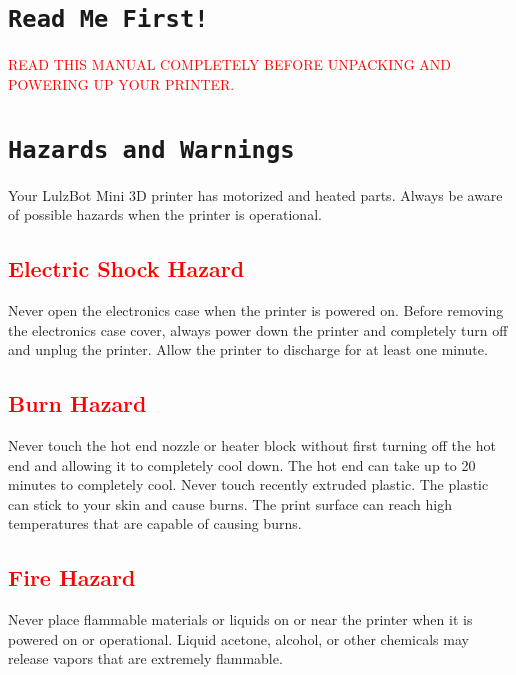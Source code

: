%
%
%
%
%

\section{\texttt{Read Me First!}}
\textcolor{red}{READ THIS MANUAL COMPLETELY BEFORE UNPACKING AND POWERING UP YOUR PRINTER.}

\section{\texttt{Hazards and Warnings}}

Your LulzBot\textsuperscript{\miniscule{\textregistered}} Mini 3D printer has motorized and heated parts.  Always be aware of possible hazards when the printer is operational.


\subsection{\textcolor{red}{Electric Shock Hazard}}
Never open the electronics case when the printer is powered on. Before removing the electronics case cover, always power down the printer and completely turn off and unplug the printer. Allow the printer to discharge for at least one minute.

\subsection{\textcolor{red}{Burn Hazard}}
Never touch the hot end nozzle or heater block without first turning off the hot end and allowing it to completely cool down. The hot end can take up to 20 minutes to completely cool. Never touch recently extruded plastic. The plastic can stick to your skin and cause burns. The print surface can reach high temperatures that are capable of causing burns.

\subsection{\textcolor{red}{Fire Hazard}}
Never place flammable materials or liquids on or near the printer when it is powered on or operational. Liquid acetone, alcohol, or other chemicals may release vapors that are extremely flammable.

